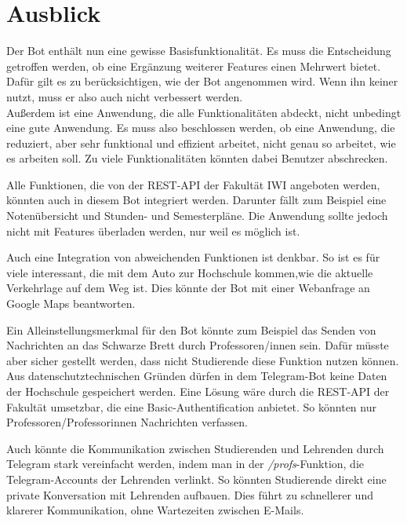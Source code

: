 \section{Ausblick}
Der Bot enthält nun eine gewisse Basisfunktionalität. Es muss die Entscheidung getroffen werden, ob eine Ergänzung weiterer Features einen Mehrwert bietet. Dafür gilt es zu berücksichtigen, wie der Bot angenommen wird. Wenn ihn keiner nutzt, muss er also auch nicht verbessert werden. \\
Außerdem ist eine Anwendung, die alle Funktionalitäten abdeckt, nicht unbedingt eine gute Anwendung. Es muss also beschlossen werden, ob eine Anwendung, die reduziert, aber sehr funktional und effizient arbeitet, nicht genau so arbeitet, wie es arbeiten soll. Zu viele Funktionalitäten könnten dabei Benutzer abschrecken.

Alle Funktionen, die von der REST-API der Fakultät IWI angeboten werden, könnten auch in diesem Bot integriert werden. Darunter fällt zum Beispiel eine Notenübersicht und Stunden- und Semesterpläne. Die Anwendung sollte jedoch nicht mit Features überladen werden, nur weil es möglich ist.

Auch eine Integration von abweichenden Funktionen ist denkbar. So ist es für viele interessant, die mit dem Auto zur Hochschule kommen,wie die aktuelle Verkehrlage auf dem Weg ist. Dies könnte der Bot mit einer Webanfrage an Google Maps beantworten.

Ein Alleinstellungsmerkmal für den Bot könnte zum Beispiel das Senden von Nachrichten an das Schwarze Brett durch Professoren/innen sein. Dafür müsste aber sicher gestellt werden, dass nicht Studierende diese Funktion nutzen können. Aus datenschutztechnischen Gründen dürfen in dem Telegram-Bot keine Daten der Hochschule gespeichert werden. Eine Lösung wäre durch die REST-API der Fakultät umsetzbar, die eine Basic-Authentification anbietet. So könnten nur Professoren/Professorinnen Nachrichten verfassen.

Auch könnte die Kommunikation zwischen Studierenden und Lehrenden durch Telegram stark vereinfacht werden, indem man in der \emph{/profs}-Funktion, die Telegram-Accounts der Lehrenden verlinkt. So könnten Studierende direkt eine private Konversation mit Lehrenden aufbauen. Dies führt zu schnellerer und klarerer Kommunikation, ohne Wartezeiten zwischen E-Mails.
